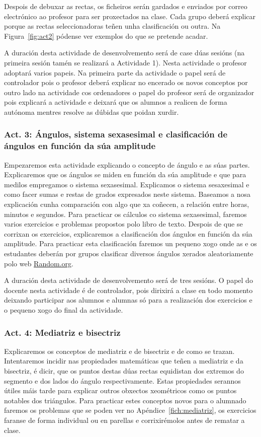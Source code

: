 Despois de debuxar as rectas, os ficheiros serán gardados e enviados por correo electrónico ao profesor para ser proxectados na clase. Cada grupo deberá explicar porque as rectas seleccionadoras teñen unha clasificación ou outra. Na Figura~\ref{fig:act2} pódense ver exemplos do que se pretende acadar.

A duración desta actividade de desenvolvemento será de case dúas sesións (na primeira sesión tamén se realizará a Actividade 1). Nesta actividade o profesor adoptará varios papeis. Na primeira parte da actividade o papel será de controlador pois o profesor deberá explicar no encerado os novos conceptos por outro lado na actividade cos ordenadores o papel do profesor será de organizador pois explicará a actividade e deixará que os alumnos a realicen de forma autónoma mentres resolve as dúbidas que poidan xurdir.

\subsubsection{Act. 3: Ángulos, sistema sexasesimal e clasificación de ángulos en función da súa amplitude}\label{act:angulos}
Empezaremos esta actividade explicando o concepto de ángulo e as súas partes. Explicaremos que os ángulos se miden en función da súa amplitude e que para medilos empregamos o sistema sexasesimal. Explicamos o sistema sesaxesimal e como facer sumas e restas de grados expresados neste sistema. Baseamos a nosa explicación cunha comparación con algo que xa coñecen, a relación entre horas, minutos e segundos. Para practicar os cálculos co sistema sexasesimal, faremos varios exercicios e problemas propostos polo libro de texto. Despois de que se corrixan os exercicios, explicaremos a clasificación dos ángulos en función da súa amplitude. Para practicar esta clasificación faremos un pequeno xogo onde as e os estudantes deberán por grupos clasificar diversos ángulos xerados aleatoriamente polo web \href{http://random.org}{Random.org}.


A duración desta actividade de desenvolvemento será de tres sesións. O papel do docente nesta actividade é de controlador, pois dirixirá a clase en todo momento deixando participar aos alumnos e alumnas só para a realización dos exercicios e o pequeno xogo do final da actividade.

\subsubsection{Act. 4: Mediatriz e bisectriz}\label{act:mediatriz}
Explicaremos os conceptos de mediatriz e de bisectriz e de como se trazan. Intentaremos incidir nas propiedades matemáticas que teñen a mediatriz e da bisectriz, é dicir, que os puntos destas dúas rectas equidistan dos extremos do segmento e dos lados do ángulo respectivamente. Estas propiedades serannos útiles máis tarde para explicar outros obxectos xeométricos como os puntos notables dos triángulos. Para practicar estes conceptos novos para o alumnado faremos os problemas que se poden ver no Apéndice~\ref{fich:mediatriz}, os exercicios faranse de forma individual ou en parellas e corrixirémolos antes de rematar a clase.

